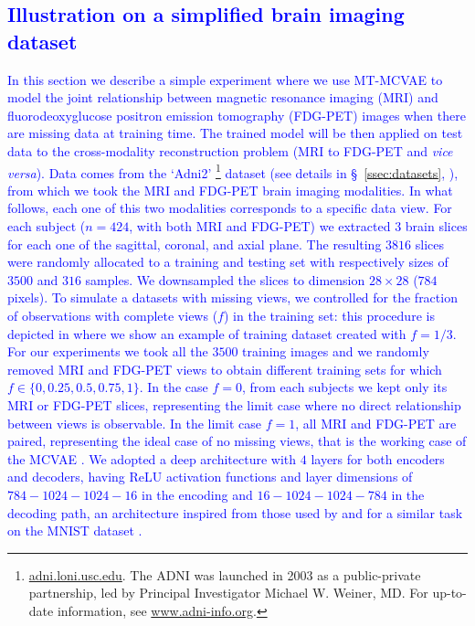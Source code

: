 \textcolor{blue}{
	\subsection{Illustration on a simplified brain imaging dataset}
	\label{sec:proof_of_concept}
	In this section we describe a simple experiment where we use MT-MCVAE to model the joint relationship between
	magnetic resonance imaging (MRI) and fluorodeoxyglucose positron emission tomography (FDG-PET) images when there are missing data at training time.
	The trained model will be then applied on test data
	to the cross-modality reconstruction problem (MRI to FDG-PET and \textit{vice versa}).
%	
	Data comes from the `Adni2'
	\footnote{
	\href{http://adni.loni.usc.edu}{adni.loni.usc.edu}.
	The ADNI was launched in 2003 as a public-private partnership, led by Principal Investigator Michael W. Weiner, MD. For up-to-date information, see \href{www.adni-info.org}{www.adni-info.org}.
	}
	dataset (see details in \S~\ref{ssec:datasets}, ), from which we took the MRI and FDG-PET brain imaging modalities.
	In what follows, each one of this two modalities corresponds to a specific data view.
	For each subject ($n=424$, with both MRI and FDG-PET) we extracted $3$ brain slices for each one of the sagittal, coronal, and axial plane.
	The resulting $3816$ slices were randomly allocated to a training and testing set with respectively sizes of $3500$ and $316$ samples.
	We downsampled the slices to dimension $28 \times 28$ ($784$ pixels).
	To simulate a datasets with missing views, we controlled for the fraction of observations with complete views ($f$) in the training set:
	this procedure is depicted in  where we show an example of training dataset created with $f=1/3$.
	For our experiments we took all the $3500$ training images and we randomly removed MRI and FDG-PET views to obtain different training sets for which $f \in \{0, 0.25, 0.5, 0.75, 1\}$.
	In the case $f = 0$, from each subjects we kept only its MRI or FDG-PET slices, representing the limit case where no direct relationship between views is observable.
	In the limit case $f = 1$, all MRI and FDG-PET are paired, representing the ideal case of no missing views, that is the working case of the MCVAE \citep{Antelmi2019}.
	We adopted a deep architecture with $4$ layers for both encoders and decoders, having ReLU activation functions and layer dimensions of $784-1024-1024-16$ in the encoding and $16-1024-1024-784$ in the decoding path,
	an architecture inspired from those used by \cite{dcca1} and \cite{dcca2} for a similar task on the MNIST dataset \citep{mnist}.
}
